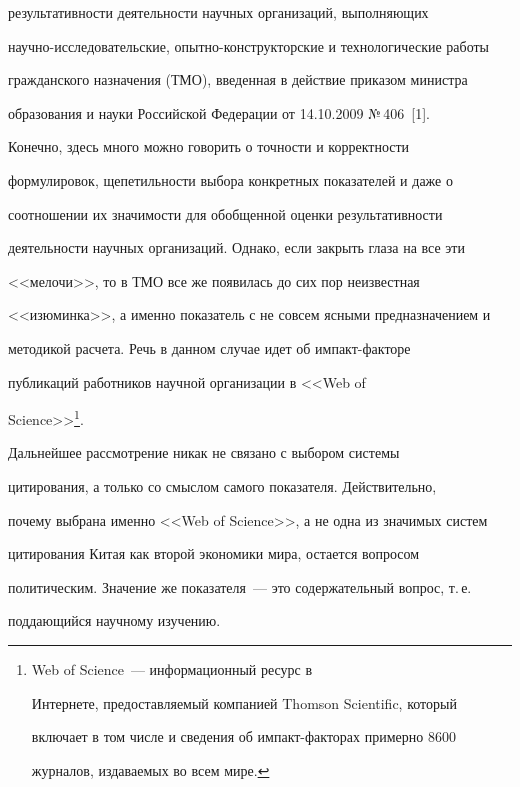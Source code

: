 результативности деятельности научных организаций, выполняющих 


на\-уч\-но-ис\-сле\-до\-ва\-тель\-ские, опыт\-но-кон\-струк\-тор\-ские и технологические работы 


гражданского назначения (ТМО), введенная в действие приказом министра 


образования и науки Российской Федерации от 14.10.2009 №\,406~[1].


    


    Конечно, здесь много можно говорить о точности и корректности 


формулировок, щепетильности выбора конкретных показателей и даже о 


соотношении их значимости для обобщенной оценки результативности 


деятельности научных организаций. Однако, если закрыть глаза на все эти 


<<мелочи>>, то в ТМО все же появилась до сих пор неизвестная 


<<изюминка>>, а именно показатель с не совсем ясными предназначением и 


методикой расчета. Речь в данном случае идет об импакт-факторе 


публикаций работников научной организации в <<Web of 


Science>>\footnote{Web of Science~--- информационный ресурс в 


Интернете, предоставляемый компанией Thomson Scientific, который 


включает в том числе и сведения об импакт-факторах примерно 8600 


журналов, издаваемых во всем мире.}.


    


    Дальнейшее рассмотрение никак не связано с выбором системы 


цитирования, а только со смыслом самого показателя. Действительно, 


почему выбрана именно <<Web of Science>>, а не одна из значимых систем 


цитирования Китая как второй экономики мира, остается вопросом 


политическим. Значение же показателя~--- это содержательный вопрос, т.\,е.\ 


поддающийся научному изучению.






